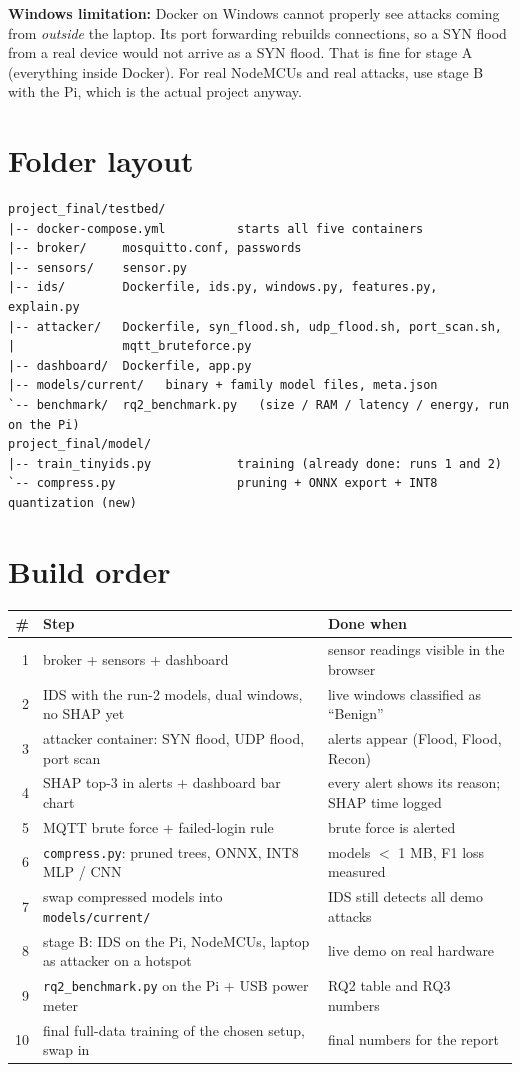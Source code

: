 \documentclass[11pt]{article}
\begin{document}
\textbf{Windows limitation:} Docker on Windows cannot properly see attacks coming from \emph{outside} the laptop. Its port forwarding rebuilds
connections, so a SYN flood from a real device would not arrive as a SYN flood. That is fine for stage A (everything inside Docker).
For real NodeMCUs and real attacks, use stage B with the Pi, which is the actual project anyway.

\newpage
\section{Folder layout}
\begin{verbatim}
project_final/testbed/
|-- docker-compose.yml          starts all five containers
|-- broker/     mosquitto.conf, passwords
|-- sensors/    sensor.py
|-- ids/        Dockerfile, ids.py, windows.py, features.py, explain.py
|-- attacker/   Dockerfile, syn_flood.sh, udp_flood.sh, port_scan.sh,
|               mqtt_bruteforce.py
|-- dashboard/  Dockerfile, app.py
|-- models/current/   binary + family model files, meta.json
`-- benchmark/  rq2_benchmark.py   (size / RAM / latency / energy, run on the Pi)
project_final/model/
|-- train_tinyids.py            training (already done: runs 1 and 2)
`-- compress.py                 pruning + ONNX export + INT8 quantization (new)
\end{verbatim}

\section{Build order}
\begin{longtable}{@{}r >{\raggedright}p{8.6cm} >{\raggedright\arraybackslash}p{5.6cm}@{}}
\toprule
\textbf{\#} & \textbf{Step} & \textbf{Done when} \\
\midrule
\endhead
1 & broker + sensors + dashboard & sensor readings visible in the browser \\
2 & IDS with the run-2 models, dual windows, no SHAP yet & live windows classified as ``Benign'' \\
3 & attacker container: SYN flood, UDP flood, port scan & alerts appear (Flood, Flood, Recon) \\
4 & SHAP top-3 in alerts + dashboard bar chart & every alert shows its reason; SHAP time logged \\
5 & MQTT brute force + failed-login rule & brute force is alerted \\
6 & \texttt{compress.py}: pruned trees, ONNX, INT8 MLP / CNN & models $<$ 1 MB, F1 loss measured \\
7 & swap compressed models into \texttt{models/current/} & IDS still detects all demo attacks \\
8 & stage B: IDS on the Pi, NodeMCUs, laptop as attacker on a hotspot & live demo on real hardware \\
9 & \texttt{rq2\_benchmark.py} on the Pi + USB power meter & RQ2 table and RQ3 numbers \\
10 & final full-data training of the chosen setup, swap in & final numbers for the report \\
\bottomrule
\end{longtable}
\end{document}

